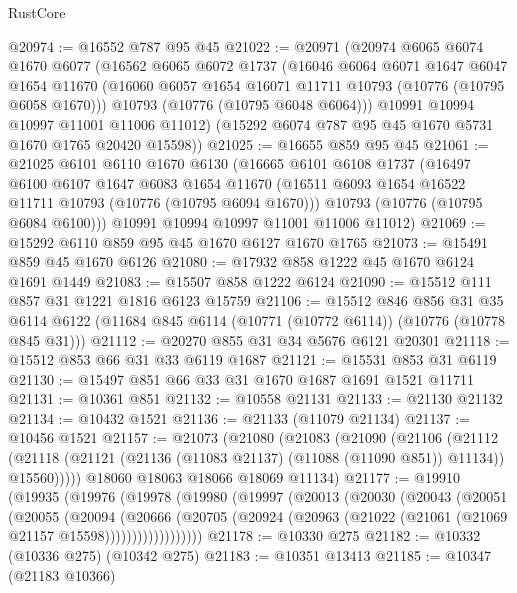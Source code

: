 \begin{lexlean}{RustCore}
\begin{coremodule}
@20974 := @16552 @787 @95 @45
@21022 := @20971
    (@20974
      @6065
      @6074
      @1670
      @6077
      (@16562
        @6065
        @6072
        @1737
        (@16046
          @6064
          @6071
          @1647
          @6047
          @1654
          @11670
          (@16060 @6057 @1654 @16071 @11711 @10793 (@10776 (@10795 @6058 @1670)))
          @10793
          (@10776 (@10795 @6048 @6064)))
        @10991
        @10994
        @10997
        @11001
        @11006
        @11012)
      (@15292 @6074 @787 @95 @45 @1670 @5731 @1670 @1765 @20420 @15598))
@21025 := @16655 @859 @95 @45
@21061 := @21025
    @6101
    @6110
    @1670
    @6130
    (@16665
      @6101
      @6108
      @1737
      (@16497
        @6100
        @6107
        @1647
        @6083
        @1654
        @11670
        (@16511 @6093 @1654 @16522 @11711 @10793 (@10776 (@10795 @6094 @1670)))
        @10793
        (@10776 (@10795 @6084 @6100)))
      @10991
      @10994
      @10997
      @11001
      @11006
      @11012)
@21069 := @15292 @6110 @859 @95 @45 @1670 @6127 @1670 @1765
@21073 := @15491 @859 @45 @1670 @6126
@21080 := @17932 @858 @1222 @45 @1670 @6124 @1691 @1449
@21083 := @15507 @858 @1222 @6124
@21090 := @15512 @111 @857 @31 @1221 @1816 @6123 @15759
@21106 := @15512
    @846
    @856
    @31
    @35
    @6114
    @6122
    (@11684 @845 @6114 (@10771 (@10772 @6114)) (@10776 (@10778 @845 @31)))
@21112 := @20270 @855 @31 @34 @5676 @6121 @20301
@21118 := @15512 @853 @66 @31 @33 @6119 @1687
@21121 := @15531 @853 @31 @6119
@21130 := @15497 @851 @66 @33 @31 @1670 @1687 @1691 @1521 @11711
@21131 := @10361 @851
@21132 := @10558 @21131
@21133 := @21130 @21132
@21134 := @10432 @1521
@21136 := @21133 (@11079 @21134)
@21137 := @10456 @1521
@21157 := @21073
    (@21080
      (@21083
        (@21090
          (@21106
            (@21112
              (@21118 (@21121 (@21136 (@11083 @21137) (@11088 (@11090 @851)) @11134)) @15560)))))
      @18060
      @18063
      @18066
      @18069
      @11134)
@21177 := @19910
    (@19935
      (@19976
        (@19978
          (@19980
            (@19997
              (@20013
                (@20030
                  (@20043
                    (@20051
                      (@20055
                        (@20094
                          (@20666
                            (@20705
                              (@20924
                                (@20963 (@21022 (@21061 (@21069 @21157 @15598))))))))))))))))))
@21178 := @10330 @275
@21182 := @10332 (@10336 @275) (@10342 @275)
@21183 := @10351 @13413
@21185 := @10347 (@21183 @10366)

\end{coremodule}
\end{lexlean}
